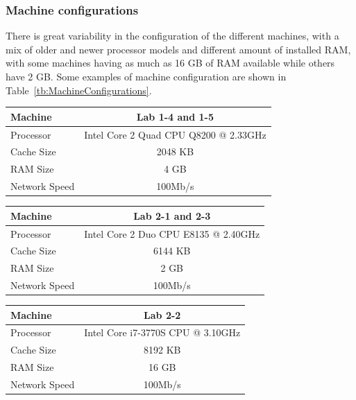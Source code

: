 \subsubsection{Machine configurations}
There is great variability in the configuration of the different machines, with a mix of older and newer processor models and different amount of installed RAM, with some machines having as much as 16 GB of RAM available while others have 2 GB. Some examples of machine configuration are shown in Table~\ref{tb:MachineConfigurations}.

\begin{table}[htdp]
\begin{center}
\begin{tabular}{|l|c|}
\hline
Machine & Lab 1-4 and 1-5 \\
\hline
Processor & Intel Core 2 Quad CPU    Q8200  @ 2.33GHz\\
\hline
Cache Size & 2048 KB\\
\hline
RAM Size & 4 GB\\
\hline
Network Speed & 100Mb/s\\
\hline
\end{tabular}
\end{center}

\begin{center}
\begin{tabular}{|l|c|}
\hline
Machine & Lab 2-1 and 2-3 \\
\hline
Processor & Intel Core 2 Duo CPU     E8135  @ 2.40GHz\\
\hline
Cache Size & 6144 KB\\
\hline
RAM Size & 2 GB\\
\hline
Network Speed & 100Mb/s\\
\hline
\end{tabular}
\end{center}
 
 \begin{center}
\begin{tabular}{|l|c|}
\hline
Machine & Lab 2-2  \\
\hline
Processor &  Intel Core i7-3770S CPU @ 3.10GHz\\
\hline
Cache Size & 8192 KB\\
\hline
RAM Size & 16 GB\\
\hline
Network Speed & 100Mb/s\\
\hline
\end{tabular}
\end{center}
 

\end{table}
